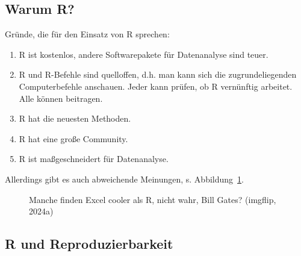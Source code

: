\documentclass[
  letterpaper,
  twoside,
  open=any]{scrbook}
\theoremstyle{definition}
\theoremstyle{definition}
\theoremstyle{definition}
\theoremstyle{remark}
\begin{document}
\subsection{Warum R?}\label{warum-r}

Gründe, die für den Einsatz von R sprechen:

\begin{enumerate}
\def\labelenumi{\arabic{enumi}.}
\item
  R ist kostenlos, andere Softwarepakete für Datenanalyse sind teuer.
\item
  R und R-Befehle sind quelloffen, d.h. man kann sich die
  zugrundeliegenden Computerbefehle anschauen. Jeder kann prüfen, ob R
  vernünftig arbeitet. Alle können beitragen.
\item
  R hat die neuesten Methoden.
\item
  R hat eine große Community.
\item
  R ist maßgeschneidert für Datenanalyse.
\end{enumerate}

Allerdings gibt es auch abweichende Meinungen, s.
Abbildung~\ref{fig-bill-excel}.

\begin{figure}


\caption{\label{fig-bill-excel}Manche finden Excel cooler als R, nicht
wahr, Bill Gates? (imgflip, 2024a)}

\end{figure}%

\subsection{R und Reproduzierbarkeit}\label{r-und-reproduzierbarkeit}
\end{document}
